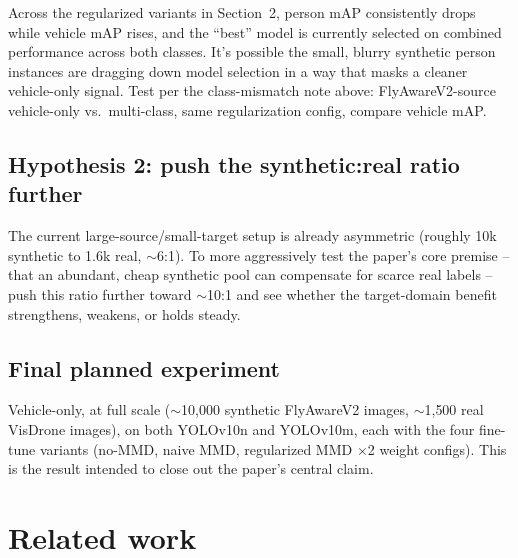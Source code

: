 \documentclass[11pt]{article}
\begin{document}
Across the regularized variants in Section~2, person mAP consistently drops while vehicle mAP
rises, and the ``best'' model is currently selected on combined performance across both
classes. It's possible the small, blurry synthetic person instances are dragging down model
selection in a way that masks a cleaner vehicle-only signal. Test per the class-mismatch note
above: FlyAwareV2-source vehicle-only vs.\ multi-class, same regularization config, compare
vehicle mAP.

\subsection{Hypothesis 2: push the synthetic:real ratio further}

The current large-source/small-target setup is already asymmetric (roughly 10k synthetic to
1.6k real, $\sim$6:1). To more aggressively test the paper's core premise -- that an abundant,
cheap synthetic pool can compensate for scarce real labels -- push this ratio further toward
$\sim$10:1 and see whether the target-domain benefit strengthens, weakens, or holds steady.

\subsection{Final planned experiment}

Vehicle-only, at full scale ($\sim$10{,}000 synthetic FlyAwareV2 images, $\sim$1{,}500 real
VisDrone images), on both YOLOv10n and YOLOv10m, each with the four fine-tune variants (no-MMD,
naive MMD, regularized MMD $\times$2 weight configs). This is the result intended to close out
the paper's central claim.

\section{Related work}
\end{document}
